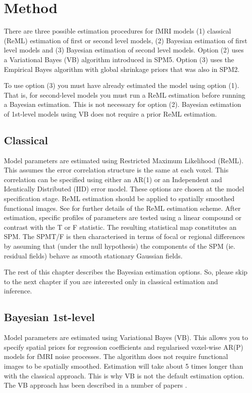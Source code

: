 \section{Method}

There are three possible estimation procedures for fMRI models (1) classical (ReML) estimation of first or second level models, (2) Bayesian estimation of first level models and (3) Bayesian estimation of second level models. Option (2) uses a Variational Bayes (VB) algorithm introduced in SPM5. Option (3) uses the Empirical Bayes algorithm with global shrinkage priors that was also in SPM2.

To use option (3) you must have already estimated the model using option (1). That is, for second-level models you must run a ReML estimation before running a Bayesian estimation. This is not necessary for option (2). Bayesian estimation of 1st-level models using VB does not require a prior ReML estimation.

\subsection{Classical}

Model parameters are estimated using Restricted Maximum Likelihood (ReML). This assumes the error correlation structure is the same at each voxel. This correlation can be specified using either an AR(1) or an Independent and Identically Distributed (IID) error model. These options are chosen at the model specification stage. ReML estimation should be applied to spatially smoothed functional images. See \cite{peb1,peb2} for further details of the ReML estimation scheme. After estimation, specific profiles of parameters are tested using a linear compound or contrast with the T or F statistic. The resulting statistical map constitutes an SPM. The SPM{T}/{F} is then characterised in terms of focal or regional differences by assuming that (under the null hypothesis) the components of the SPM (ie. residual fields) behave as smooth stationary Gaussian fields.

The rest of this chapter describes the Bayesian estimation options. So, please skip to the next chapter if you are interested only in classical estimation and inference. 

\subsection{Bayesian 1st-level}

Model parameters are estimated using Variational Bayes (VB). This allows you to specify spatial priors for regression coefficients and regularised voxel-wise AR(P) models for fMRI noise processes. The algorithm does not require functional images to be spatially smoothed. Estimation will take about 5 times longer than with the classical approach. This is why VB is not the default estimation option. The VB approach has been described in a number of papers \cite{vb_fmri_ar,vb2,vb3,will_bayes_srglm}.

